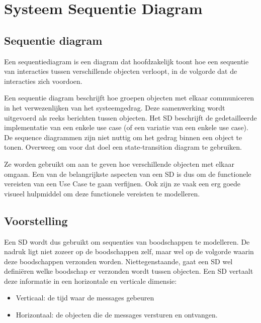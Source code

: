 \chapter{Systeem Sequentie Diagram}

\section{Sequentie diagram}

\begin{definition}
Een sequentiediagram is een diagram dat hoofdzakelijk toont hoe een sequentie van interacties tussen verschillende objecten verloopt, in de volgorde dat de interacties zich voordoen. 
\end{definition}

Een sequentie diagram beschrijft hoe groepen objecten met elkaar communiceren in het verwezenlijken van het systeemgedrag. Deze samenwerking wordt uitgevoerd als reeks berichten tussen objecten. Het SD beschrijft de gedetailleerde implementatie van een enkele use case (of een variatie van een enkele use case). De sequence diagrammen zijn niet nuttig om het gedrag binnen een object te tonen. Overweeg om voor dat doel een state-transition diagram te gebruiken.

Ze worden gebruikt om aan te geven hoe verschillende objecten met elkaar omgaan. Een van de belangrijkste aspecten van een SD is dus om de functionele vereisten van een Use Case te gaan verfijnen. Ook zijn ze vaak een erg goede visueel hulpmiddel om deze functionele vereisten te modelleren.

\section{Voorstelling}

Een SD wordt dus gebruikt om sequenties van boodschappen te modelleren. De nadruk ligt niet zozeer op de boodschappen zelf, maar wel op de volgorde waarin deze boodschappen verzonden worden. Niettegenstaande, gaat een SD wel defini\"eren welke boodschap er verzonden wordt tussen objecten. Een SD vertaalt deze informatie in een horizontale en verticale dimensie: 
\begin{itemize}
	\item Verticaal: de tijd waar de messages gebeuren 
	\item Horizontaal: de objecten die de messages versturen en ontvangen.
\end{itemize}

